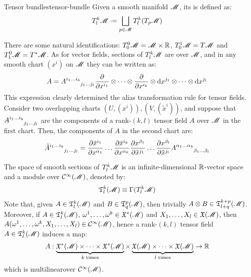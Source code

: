 \begin{definition}{Tensor bundles}{tensor-bundle}
  Given a smooth manifold $ \mathscr{M} $, its  is defined as:
  \begin{equation}
    T^k_l\man \defeq \bigsqcup_{p \in \man} T^k_l(T_p\man)
  \end{equation}
\end{definition}

There are some natural identifications: $ T^0_0\mathscr{M} = \mathscr{M} \times \mathbb{R} $, $ T^1_0\mathscr{M} = T\mathscr{M} $ and $ T^0_1\mathscr{M} = T^*\mathscr{M} $. As for vector fields, sections of $ T^k_l\mathscr{M} $ are  over $ \mathscr{M} $, and in any smooth chart $ (x^i) $ on $ \mathscr{M} $ they can be written as:
\begin{equation}
  A = \tensor{A}{^{i_1 \dots i_k}_{j_1 \dots j_l}} \frac{\pa}{\pa x^{i_1}} \otimes \dots \otimes \frac{\pa}{\pa x^{i_k}} \otimes \dd x^{j_1} \otimes \dots \otimes \dd x^{j_l}
  \label{eq:tensor-comp}
\end{equation}
 This expression clearly determined the alias transformation rule for tensor fields. Consider two overlapping charts $ (U,(x^i)) , (V,(\tilde{x}^i)) $, and suppose that $ \tensor{A}{^{i_1 \dots i_k}_{j_1 \dots j_l}} $ are the components of a rank-$ (k,l) $ tensor field $ A $ over $ \mathscr{M} $ in the first chart. Then, the components of $ A $ in the second chart are:
\begin{equation}
  \tensor{\tilde{A}}{^{i_1 \dots i_k}_{j_1 \dots j_l}} = \frac{\pa \tilde{x}^{i_1}}{\pa x^{\alpha_1}} \dots \frac{\pa \tilde{x}^{i_k}}{\pa x^{\alpha_k}} \frac{\pa x^{\beta_1}}{\pa \tilde{x}^{j_1}} \dots \frac{\pa x^{\beta_l}}{\pa \tilde{x}^{j_l}} \tensor{A}{^{\alpha_1 \dots \alpha_k}_{\beta_1 \dots \beta_l}}
  \label{eq:tensor-trans}
\end{equation}

The space of smooth sections of $ T^k_l\mathscr{M} $ is an infinite-dimensional $ \mathbb{R} $-vector space and a module over $ \mathcal{C}^{\infty}(\mathscr{M}) $, denoted by:
\begin{equation}
  \mathfrak{T}^{k}_{l}(\mathscr{M}) \equiv \Gamma(T^k_l\mathscr{M})
\end{equation}
Note that, given $ A \in \mathfrak{T}^{k}_{l}(\mathscr{M}) $ and $ B \in \mathfrak{T}^{p}_{q}(\mathscr{M}) $, then trivially $ A \otimes B \in \mathfrak{T}^{k+p}_{l+q}(\mathscr{M}) $. Moreover, if $ A \in \mathfrak{T}^{k}_{l}(\mathscr{M}) $, $ \omega^1 , \dots , \omega^k \in \mathfrak{X}^*(\mathscr{M}) $ and $ X_1 , \dots , X_l \in \mathfrak{X}(\mathscr{M}) $, then $ A(\omega^1 , \dots , \omega^k , X_1 , \dots , X_l) \in \mathcal{C}^{\infty}(\mathscr{M}) $, hence a rank-$ (k,l) $ tensor field $ A \in \mathfrak{T}^{k}_{l}(\mathscr{M}) $ induces a map:
\begin{equation}
  A : \underbrace{\mathfrak{X}^*(\mathscr{M}) \times \dots \times \mathfrak{X}^*(\mathscr{M})}_{k \text{ times}} \times \underbrace{\mathfrak{X}(\mathscr{M}) \times \dots \times \mathfrak{X}(\mathscr{M})}_{l \text{ times}} \rightarrow \mathbb{R}
  \label{eq:tensor-linear}
\end{equation}
which is multilinear\footnotemark over $ \mathcal{C}^{\infty}(\mathscr{M}) $.

